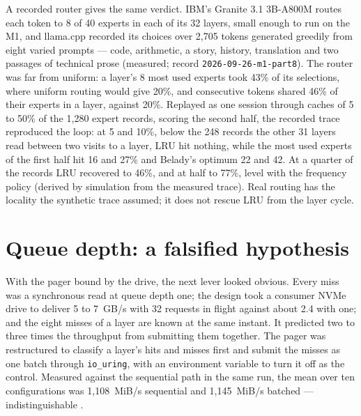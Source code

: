 
A recorded router gives the same verdict. IBM's Granite 3.1 3B-A800M routes each
token to 8 of 40 experts in each of its 32 layers, small enough to run on the
M1, and llama.cpp recorded its choices over 2,705 tokens generated greedily from
eight varied prompts --- code, arithmetic, a story, history, translation and two
passages of technical prose (measured; record \texttt{2026-09-26-m1-part8}). The
router was far from uniform: a layer's 8 most used experts took 43\% of its
selections, where uniform routing would give 20\%, and consecutive tokens shared
46\% of their experts in a layer, against 20\%. Replayed as one session through
caches of 5 to 50\% of the 1,280 expert records, scoring the second half, the
recorded trace reproduced the loop: at 5 and 10\%, below the 248 records the
other 31 layers read between two visits to a layer, LRU hit nothing, while the
most used experts of the first half hit 16 and 27\% and Belady's optimum 22 and
42. At a quarter of the records LRU recovered to 46\%, and at half to 77\%, level
with the frequency policy (derived by simulation from the measured trace). Real
routing has the locality the synthetic trace assumed; it does not rescue LRU from
the layer cycle.

\section{Queue depth: a falsified hypothesis}

With the pager bound by the drive, the next lever looked obvious. Every miss
was a synchronous read at queue depth one; the design took a consumer NVMe
drive to deliver 5 to 7~GB/s with 32 requests in flight against about 2.4 with
one; and the eight misses of a layer are known at the same instant. It
predicted two to three times the throughput from submitting them together. The
pager was restructured to classify a layer's hits and misses first and submit
the misses as one batch through \texttt{io\_uring}, with an environment variable
to turn it off as the control. Measured against the sequential path in the same
run, the mean over ten configurations was 1,108~MiB/s sequential and
1,145~MiB/s batched --- indistinguishable \cite{hermon2026batchio}.


